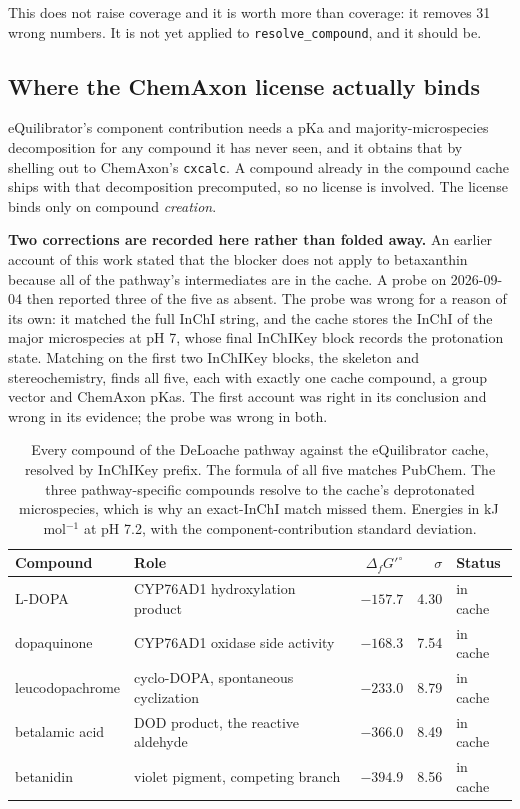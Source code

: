This does not raise coverage and it is worth more than coverage: it removes 31 wrong
numbers. It is not yet applied to \texttt{resolve\_compound}, and it should be.

\subsection{Where the ChemAxon license actually binds}

eQuilibrator's component contribution needs a pKa and majority-microspecies decomposition
for any compound it has never seen, and it obtains that by shelling out to ChemAxon's
\texttt{cxcalc}. A compound already in the compound cache ships with that decomposition
precomputed, so no license is involved. The license binds only on compound \emph{creation}.

\textbf{Two corrections are recorded here rather than folded away.} An earlier account of
this work stated that the blocker does not apply to betaxanthin because all of the pathway's
intermediates are in the cache. A probe on 2026-09-04 then reported three of the five as
absent. The probe was wrong for a reason of its own: it matched the full InChI string, and
the cache stores the InChI of the major microspecies at pH 7, whose final InChIKey block
records the protonation state. Matching on the first two InChIKey blocks, the skeleton and
stereochemistry, finds all five, each with exactly one cache compound, a group vector and
ChemAxon pKas. The first account was right in its conclusion and wrong in its evidence; the
probe was wrong in both.

\begin{table}[H]
  \centering
  \footnotesize
  \caption[Betaxanthin pathway resolution]{Every compound of the DeLoache pathway against
  the eQuilibrator cache, resolved by InChIKey prefix. The formula of all five matches
  PubChem. The three pathway-specific compounds resolve to the cache's deprotonated
  microspecies, which is why an exact-InChI match missed them. Energies in kJ\,mol$^{-1}$
  at pH 7.2, with the component-contribution standard deviation.}
  \label{tab:bx-cache}
  \begin{tabular}{@{}llrrl@{}}
    \hline
    Compound & Role & $\Delta_f G'^{\circ}$ & $\sigma$ & Status \\
    \hline
    L-DOPA & CYP76AD1 hydroxylation product & $-157.7$ & 4.30 & in cache \\
    dopaquinone & CYP76AD1 oxidase side activity & $-168.3$ & 7.54 & in cache \\
    leucodopachrome & cyclo-DOPA, spontaneous cyclization & $-233.0$ & 8.79 & in cache \\
    betalamic acid & DOD product, the reactive aldehyde & $-366.0$ & 8.49 & in cache \\
    betanidin & violet pigment, competing branch & $-394.9$ & 8.56 & in cache \\
    \hline
  \end{tabular}
\end{table}

